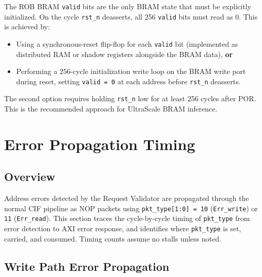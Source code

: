 The ROB BRAM \texttt{valid} bits are the only BRAM state that must be
explicitly initialized. On the cycle \texttt{rst\_n} deasserts, all 256
\texttt{valid} bits must read as 0. This is achieved by:
\begin{itemize}
  \item Using a synchronous-reset flip-flop for each \texttt{valid} bit
        (implemented as distributed RAM or shadow registers alongside the BRAM
        data), \textbf{or}
  \item Performing a 256-cycle initialization write loop on the BRAM write port
        during reset, setting \texttt{valid = 0} at each address before
        \texttt{rst\_n} deasserts.
\end{itemize}
The second option requires holding \texttt{rst\_n} low for at least 256 cycles
after POR. This is the recommended approach for UltraScale BRAM inference.

\newpage
\section{Error Propagation Timing}

\subsection{Overview}

Address errors detected by the Request Validator are propagated through the
normal CIF pipeline as NOP packets using \texttt{pkt\_type[1:0] = 10}
(\texttt{Err\_write}) or \texttt{11} (\texttt{Err\_read}). This section traces
the cycle-by-cycle timing of \texttt{pkt\_type} from error detection to AXI
error response, and identifies where \texttt{pkt\_type} is set, carried, and
consumed. Timing counts assume no stalls unless noted.

\subsection{Write Path Error Propagation}

